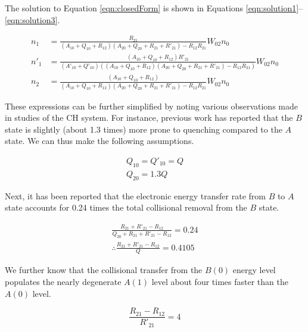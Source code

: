 The solution to Equation \ref{eqn:closedForm} is shown in Equations \ref{eqn:solution1}--\ref{eqn:solution3}.

\begin{align}
  n_1 &= \frac{ R_{21} }{ ( A_{10} + Q_{10} + R_{12} )( A_{20} + Q_{20} + R_{21} + R'_{21} ) - R_{12}R_{21} }W_{02}n_0
  \label{eqn:solution1}\\
  n'_1 &= \frac{ ( A_{10} + Q_{10} + R_{12} )R'_{21} }{ ( A'_{10} + Q'_{10} ) ( ( A_{10} + Q_{10} + R_{12} )( A_{20} + Q_{20} + R_{21} + R'_{21} ) - R_{12}R_{21} ) }W_{02}n_0
  \label{eqn:solution2}\\
  n_2 &= \frac{ ( A_{10} + Q_{10} + R_{12} ) }{ ( A_{10} + Q_{10} + R_{12} )( A_{20} + Q_{20} + R_{21} + R'_{21} ) - R_{12}R_{21} }W_{02}n_0
  \label{eqn:solution3}
\end{align}

These expressions can be further simplified by noting various observations made in studies of the CH system.
For instance, previous work\cite{1984-cool,1985-garland-b} has reported that the \(B\) state is slightly (about 1.3 times) more prone to quenching compared to the \(A\) state.
We can thus make the following assumptions.

\begin{gather}
  Q_{10} = Q'_{10} = Q
  \label{eqn:quenchingAssumption1}\\
  Q_{20} = 1.3Q
  \label{eqn:quenchingAssumption2}
\end{gather}

Next, it has been reported\cite{2000-luque} that the electronic energy transfer rate from \(B\) to \(A\) state accounts for 0.24 times the total collisional removal from the \(B\) state.

\begin{gather}
  \frac{ R_{21} + R'_{21} - R_{12} }{ Q_{20} + R_{21} + R'_{21} - R_{12} } = 0.24\\
  \therefore \frac{ R_{21} + R'_{21} - R_{12} }{ Q } = 0.4105
  \label{eqn:REquation1}
\end{gather}

We further know\cite{1985-garland-b, 2000-luque} that the collisional transfer from the \(B(0)\) energy level populates the nearly degenerate \(A(1)\) level about four times faster than the \(A(0)\) level.

\begin{equation}
  \frac{ R_{21} - R_{12} }{ R'_{21} } = 4
  \label{eqn:REquation2}
\end{equation}

